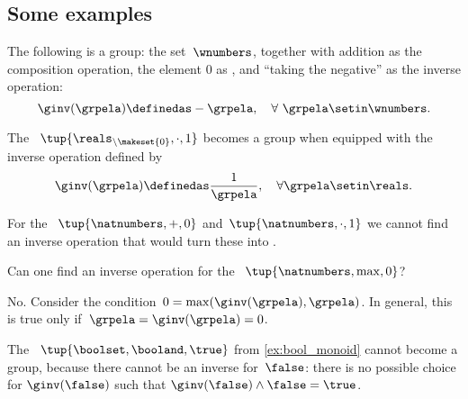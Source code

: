 \subsection{Some examples}

\begin{example}
    The following is a group: the set~$\wnumbers$, together with addition as the composition operation, the element $0$ as , and ``taking the negative'' as the inverse operation:
    \begin{equation}
        \ginv(\grpela) \definedas -\grpela, \quad \forall \ \grpela \setin \wnumbers.
    \end{equation}
\end{example}
\begin{example}
    The  ~$\tup{\reals_{\backslash \makeset{0}}, \cdot, 1}$ becomes a group when equipped with the inverse operation defined by
    \begin{equation}
        \ginv(\grpela) \definedas \frac{1}{\grpela}, \quad \forall \grpela \setin \reals.
    \end{equation}
\end{example}

\begin{example}
    For the ~$\tup{\natnumbers, +,0}$ and~$\tup{\natnumbers,\cdot,1}$ we cannot find an inverse operation that would turn these  into .
\end{example}

\begin{exercise}
    Can one find an inverse operation for the  ~$\tup{\natnumbers,\max,0}$?
\end{exercise}
%
\begin{solution}
    No.
    Consider the condition~$0=\max(\ginv(\grpela),\grpela)$.
    In general, this is true only if~$\grpela=\ginv(\grpela)=0$.
\end{solution}

\begin{example}
    The  ~$\tup{\boolset,\booland, \true}$ from \cref{ex:bool_monoid} cannot become a group, because there cannot be an inverse for~$\false$: there is no possible choice for $\ginv(\false)$ such that $\ginv(\false)\wedge \false=\true$.
\end{example}

